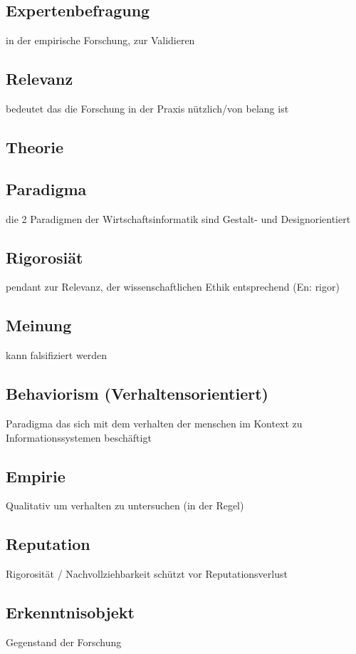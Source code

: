 \documentclass[DIV=calc, paper=a4, fontsize=11pt, twocolumn]{scrartcl}	 %
\begin{document}
\subsection*{Expertenbefragung}
in der empirische Forschung, zur Validieren

\subsection*{Relevanz}
bedeutet das die Forschung in der Praxis n\"utzlich/von belang ist

\subsection*{Theorie}

\subsection*{Paradigma}
die 2 Paradigmen der Wirtschaftsinformatik sind Gestalt- und Designorientiert

\subsection*{Rigorosiät}
pendant zur Relevanz, der wissenschaftlichen Ethik entsprechend (En: rigor)

\subsection*{Meinung}
kann falsifiziert werden

\subsection*{Behaviorism (Verhaltensorientiert)}
Paradigma das sich mit dem verhalten der menschen im Kontext zu Informationssystemen beschäftigt

\subsection*{Empirie}
Qualitativ um verhalten zu untersuchen (in der Regel)

\subsection*{Reputation}
Rigorosität / Nachvollziehbarkeit schützt vor Reputationsverlust

\subsection*{Erkenntnisobjekt}
Gegenstand der Forschung
\end{document}
